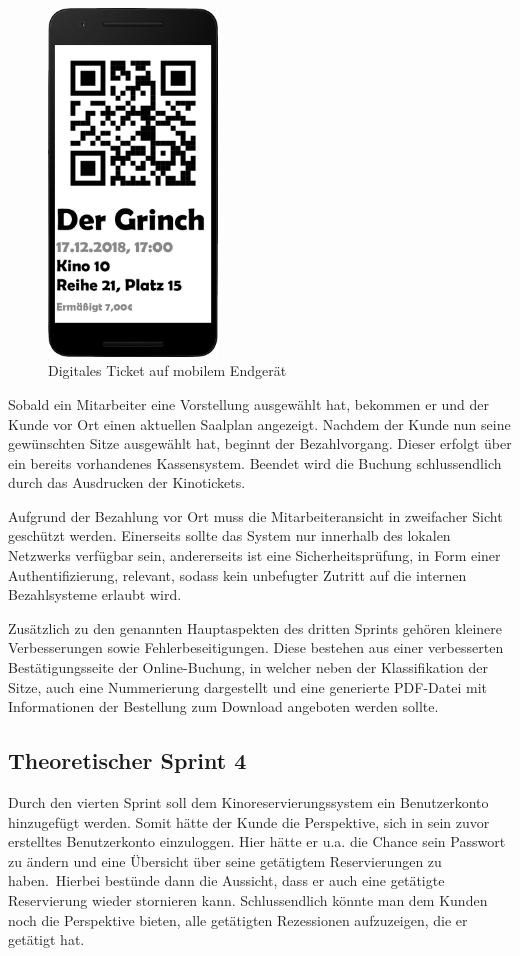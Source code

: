 \begin{figure}[ht]
	\centering
	\includegraphics[width=0.4\textwidth]{img/ticket_phone}
	\captionsetup{format=hang}
	\caption{Digitales Ticket auf mobilem Endgerät}
	\label{fig:ticket_phone}
\end{figure}

Sobald ein Mitarbeiter eine Vorstellung ausgewählt hat, bekommen er und der Kunde vor Ort einen aktuellen Saalplan angezeigt.
Nachdem der Kunde nun seine gewünschten Sitze ausgewählt hat, beginnt der Bezahlvorgang.
Dieser erfolgt über ein bereits vorhandenes Kassensystem. Beendet wird die Buchung schlussendlich durch das Ausdrucken der Kinotickets. 

Aufgrund der Bezahlung vor Ort muss die Mitarbeiteransicht in zweifacher Sicht geschützt werden.
Einerseits sollte das System nur innerhalb des lokalen Netzwerks verfügbar sein, andererseits ist eine Sicherheitsprüfung, in Form einer Authentifizierung, relevant, sodass kein unbefugter Zutritt auf die internen Bezahlsysteme erlaubt wird.

Zusätzlich zu den genannten Hauptaspekten des dritten Sprints gehören kleinere Verbesserungen sowie Fehlerbeseitigungen.
Diese bestehen aus einer verbesserten Bestätigungsseite der Online-Buchung, in welcher neben der Klassifikation der Sitze, auch eine Nummerierung dargestellt und eine generierte PDF-Datei mit Informationen der Bestellung zum Download angeboten werden sollte.

\subsection{Theoretischer Sprint 4}
\label{ssssec:sprint_benuterkonto}
\authorsection{\authorSG}
Durch den vierten Sprint soll dem Kinoreservierungssystem ein Benutzerkonto hinzugefügt werden.
Somit hätte der Kunde die Perspektive, sich in sein zuvor erstelltes Benutzerkonto einzuloggen.
Hier hätte er u.a. die Chance sein Passwort zu ändern und eine Übersicht über seine getätigtem Reservierungen zu haben.\
Hierbei bestünde dann die Aussicht, dass er auch eine getätigte Reservierung wieder stornieren kann.
Schlussendlich könnte man dem Kunden noch die Perspektive bieten, alle getätigten Rezessionen aufzuzeigen, die er getätigt hat. 

